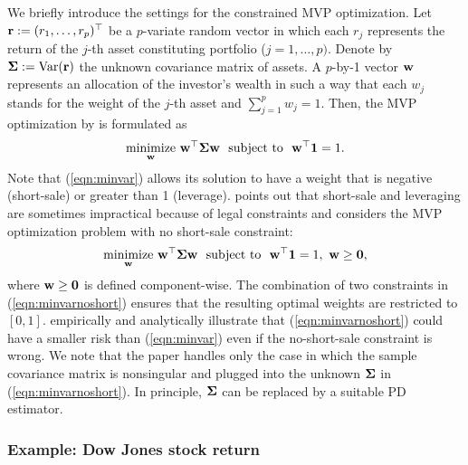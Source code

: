 \documentclass[times,sort&compress,3p]{elsarticle}
\newcommand{\minimize}{\mathop{\rm minimize}}
\newcommand{\var}{{\rm Var}}
\begin{document}
We briefly introduce the settings for the constrained MVP optimization.
Let ${\bf r}:= (r_1, \ldots, r_p)^{\top}$ be a $p$-variate random vector in
which each $r_j$ represents the return of the $j$-th asset constituting portfolio ($j = 1, \ldots, p)$.
Denote by ${\bf \Sigma}:= \var ({\bf r})$ the unknown covariance matrix of assets.
A $p$-by-1 vector ${\bf w}$ represents an allocation of the investor's wealth in such a way that each $w_j$ stands for the weight of the $j$-th asset and $\sum_{j=1}^p w_j = 1$.
Then, the MVP optimization by \citet{Chan1999} is formulated as
%
\begin{equation}\label{eqn:minvar}
\minimize_{\bf w}\, {\bf w}^{\top}{\bf \Sigma}{\bf w} ~~\mbox{subject to}~~
	{\bf w}^{\top}{\bf 1} = 1.
\end{equation}
%
Note that (\ref{eqn:minvar}) allows its solution to have a weight that is negative (short-sale) or greater than 1 (leverage). 
\citet{Jagannathan2003} points out that short-sale and leveraging are sometimes impractical because of
legal constraints and considers  the MVP optimization problem with no short-sale constraint:
\begin{equation}\label{eqn:minvarnoshort}
\minimize_{\bf w}\, {\bf w}^{\top}{\bf \Sigma}{\bf w} ~~\mbox{subject to}~~
	{\bf w}^{\top}{\bf 1} = 1, ~ {\bf w} \geq {\bf 0},
\end{equation}
where ${\bf w} \geq {\bf 0}$ is defined component-wise.
%
The combination of two constraints in (\ref{eqn:minvarnoshort}) ensures that the resulting optimal weights  are restricted to $[0,1]$.
\citet{Jagannathan2003} empirically and analytically illustrate that (\ref{eqn:minvarnoshort})
could have a smaller risk than (\ref{eqn:minvar})
even if the no-short-sale constraint is wrong. We note that the paper handles only the case in which the sample
covariance matrix is nonsingular and plugged into the unknown ${\bf \Sigma}$ in (\ref{eqn:minvarnoshort}). In principle, ${\bf \Sigma}$ can be replaced by a suitable PD estimator.


\subsubsection{Example: Dow Jones stock return}
\end{document}
